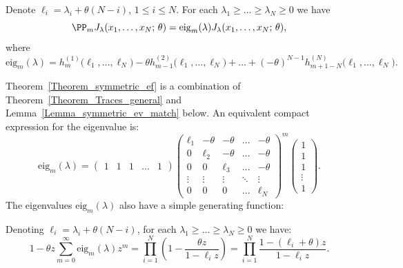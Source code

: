 \begin{theorem} \label{Theorem_symmetric_ef}
 Denote $\ell_i=\lambda_i+\theta(N-i)$, $1\le i \le N$. For each $\lambda_1\ge \dots\ge \lambda_N\ge 0$ we have
 \begin{equation}
  \PP_m J_\lambda(x_1,\dots,x_N;\, \theta)= \mathrm{eig}_m(\lambda) J_\lambda(x_1,\dots,x_N;\, \theta),
 \end{equation}
 where
 \begin{equation}
 \label{eq_Jack_ev}
  \mathrm{eig}_m(\lambda)=h^{(1)}_m\bigl(\ell_1,\dots,\ell_N\bigr)-\theta h^{(2)}_{m-1}\bigl(\ell_1,\dots,\ell_N\bigr)+\dots+(-\theta)^{N-1}  h^{(N)}_{m+1-N}\bigl(\ell_1,\dots,\ell_N\bigr).
 \end{equation}
\end{theorem}

Theorem~\ref{Theorem_symmetric_ef} is a combination of Theorem~\ref{Theorem_Traces_general} and Lemma~\ref{Lemma_symmetric_ev_match} below.
An equivalent compact expression for the eigenvalue is:
\begin{equation}
\label{eq_x7}
 \mathrm{eig}_m(\lambda)=\begin{pmatrix}
1 & 1 & 1 & \ldots & 1
\end{pmatrix}
\begin{pmatrix}
\ell_{1} & -\theta & -\theta & \ldots & -\theta\\
0 & \ell_{2} & -\theta & \ldots & -\theta\\
0 & 0 & \ell_{3} & \ldots & -\theta\\
\vdots & \vdots & \vdots & \ddots & \vdots\\
0 & 0 & 0 & \ldots &  \ell_{N}
\end{pmatrix}
^{m}
\begin{pmatrix}
1\\
1\\
1\\
\vdots\\
1
\end{pmatrix}.
\end{equation}
The eigenvalues $\mathrm{eig}_m(\lambda)$ also have a simple generating function:
\begin{prop} \label{Proposition_sym_gen_funct} Denoting $\ell_i=\lambda_i+\theta(N-i)$, for each $\lambda_1\ge \dots\ge \lambda_N\ge 0$ we have:
\begin{equation}
\label{eq_x8}
 1-\theta z \sum_{m=0}^{\infty}  \mathrm{eig}_m(\lambda) z^m =\prod_{i=1}^N\left(1-\frac{\theta z}{1-\ell_i z}\right)=\prod_{i=1}^{N}\frac{1-(\ell_i+\theta)z}{1-\ell_i z}.
\end{equation}
\end{prop}
